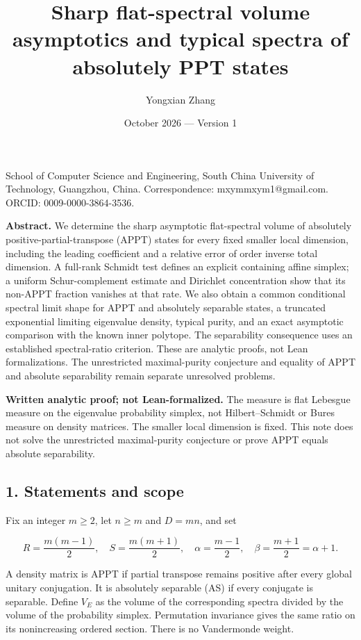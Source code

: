\documentclass[
  11pt,
]{article}
\title{Sharp flat-spectral volume asymptotics and typical spectra of
absolutely PPT states}
\author{Yongxian Zhang}
\date{October 2026 --- Version 1}
\begin{document}
\maketitle

School of Computer Science and Engineering, South China University of
Technology, Guangzhou, China. Correspondence: mxymmxym1@gmail.com.
ORCID: 0009-0000-3864-3536.

\textbf{Abstract.} We determine the sharp asymptotic flat-spectral
volume of absolutely positive-partial-transpose (APPT) states for every
fixed smaller local dimension, including the leading coefficient and a
relative error of order inverse total dimension. A full-rank Schmidt
test defines an explicit containing affine simplex; a uniform
Schur-complement estimate and Dirichlet concentration show that its
non-APPT fraction vanishes at that rate. We also obtain a common
conditional spectral limit shape for APPT and absolutely separable
states, a truncated exponential limiting eigenvalue density, typical
purity, and an exact asymptotic comparison with the known inner
polytope. The separability consequence uses an established
spectral-ratio criterion. These are analytic proofs, not Lean
formalizations. The unrestricted maximal-purity conjecture and equality
of APPT and absolute separability remain separate unresolved problems.

\textbf{Written analytic proof; not Lean-formalized.} The measure is
flat Lebesgue measure on the eigenvalue probability simplex, not
Hilbert--Schmidt or Bures measure on density matrices. The smaller local
dimension is fixed. This note does not solve the unrestricted
maximal-purity conjecture or prove APPT equals absolute separability.

\hypertarget{statements-and-scope}{%
\subsection{1. Statements and scope}\label{statements-and-scope}}

Fix an integer \(m\geq2\), let \(n\geq m\) and \(D=mn\), and set

\[
R=\frac{m(m-1)}2,\quad S=\frac{m(m+1)}2,\quad
\alpha=\frac{m-1}2,\quad\beta=\frac{m+1}2=\alpha+1.
\]

A density matrix is APPT if partial transpose remains positive after
every global unitary conjugation. It is absolutely separable (AS) if
every conjugate is separable. Define \(V_E\) as the volume of the
corresponding spectra divided by the volume of the probability simplex.
Permutation invariance gives the same ratio on its nonincreasing ordered
section. There is no Vandermonde weight.
\end{document}
